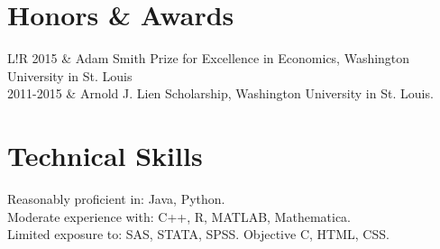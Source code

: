 \documentclass[10pt]{article}
\newcommand\VRule{\color{lightgray}\vrule width 0.5pt}
\begin{document}


\section*{Honors \& Awards}
\begin{tabular}{L!{\VRule}R}
2015 & Adam Smith Prize for Excellence in Economics, Washington University in St. Louis  \\

2011-2015 & Arnold J. Lien Scholarship, Washington University in St. Louis.
\\
\end{tabular}


\section*{Technical Skills}
Reasonably proficient in: Java, Python.  \\
Moderate experience with: C++, R, MATLAB, Mathematica. \\
Limited exposure to: SAS, STATA, SPSS.  Objective C, HTML, CSS.  

\end{document}
